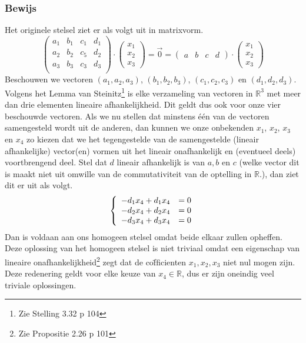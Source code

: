 \documentclass[lineaire_algebra_oplossingen.tex]{subfiles}
\begin{document}
\subsubsection*{Bewijs}
Het originele stelsel ziet er als volgt uit in matrixvorm.
\[
\begin{pmatrix}
a_1 & b_1 & c_1 & d_1\\
a_2 & b_2 & c_5 & d_2\\
a_3 & b_3 & c_3 & d_3\\
\end{pmatrix}
\cdot
\begin{pmatrix}
x_1\\ x_2\\x_3
\end{pmatrix}
= \vec{0}
= 
\begin{pmatrix}
a & b & c & d
\end{pmatrix}
\cdot
\begin{pmatrix}
x_1\\ x_2\\x_3
\end{pmatrix}
\]
Beschouwen we vectoren $(a_1,a_2,a_3)$, $(b_1,b_2,b_3)$, $(c_1,c_2,c_3)$ en $(d_1,d_2,d_3)$. Volgens het Lemma van Steinitz\footnote{Zie Stelling 3.32 p 104} is elke verzameling van vectoren in $\mathbb{R}^3$ met meer dan drie elementen lineaire afhankelijkheid. Dit geldt dus ook voor onze vier beschouwde vectoren. Als we nu stellen dat minstens \'e\'en van de vectoren samengesteld wordt uit de anderen, dan kunnen we onze onbekenden $x_1$, $x_2$, $x_3$ en $x_4$ zo kiezen dat we het tegengestelde van de samengestelde (lineair afhankelijke) vector(en) vormen uit het lineair onafhankelijk en (eventueel deels) voortbrengend deel. Stel dat $d$ lineair afhankelijk is van $a, b$ en $c$ (welke vector dit is maakt niet uit omwille van de commutativiteit van de optelling in $\mathbb{R}$.), dan ziet dit er uit als volgt.
\[
\left\lbrace
\begin{array}{c c}
-d_1x_4 + d_1x_4 &= 0 \\
-d_2x_4 + d_2x_4 &= 0 \\
-d_3x_4 + d_3x_4 &= 0 \\
\end{array}
\right.
\]
Dan is voldaan aan ons homogeen stelsel omdat beide elkaar zullen opheffen. Deze oplossing van het homogeen stelsel is niet triviaal omdat een eigenschap van lineaire onafhankelijkheid\footnote{Zie Propositie 2.26 p 101} zegt dat de co\"fficienten $x_1,x_2,x_3$ niet nul mogen zijn.
Deze redenering geldt voor elke keuze van $x_4\in \mathbb{R}$, dus er zijn oneindig veel triviale oplossingen.
\end{document}
